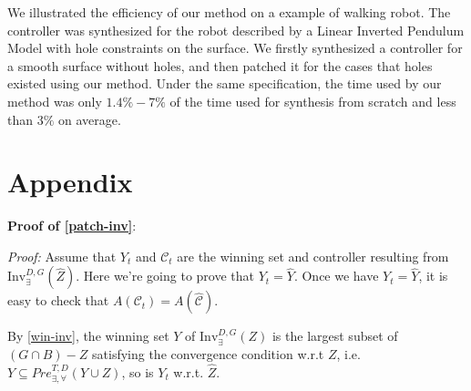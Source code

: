 We illustrated the efficiency of our method on a example of walking robot. The controller was synthesized for the robot described by a Linear Inverted Pendulum Model with hole constraints on the surface. We firstly synthesized a controller for a smooth surface without holes, and then patched it for the cases that holes existed using our method. Under the same specification, the time used by our method was only $ 1.4\%-7\% $ of the time used for synthesis from scratch and less than $ 3\% $ on average. 




\iffalse
\section{Appendix}
\textbf{Proof of \eqref{patch-inv}}:

\emph{Proof:}
	Assume that $ Y_t $ and $ \mathcal{C}_t $ are the winning set and controller resulting from $ \text{Inv}_{\exists}^{D,G} (\widehat{Z}) $. Here we're going to prove that $ Y_t=\widehat{Y}$. Once we have $ Y_t=\widehat{Y}$, it is easy to check that $ A(\mathcal{C}_t) = A(\widehat{\mathcal{C}}) $.
	
	By \eqref{win-inv}, the winning set $ Y $ of $ \text{Inv}_{\exists}^{D,G} (Z) $ is the largest subset of $ (G\cap B) - Z  $ satisfying the convergence condition w.r.t $ Z $, i.e. $ Y \subseteq Pre^{T,D}_{\exists, \forall}(Y\cup Z) $, so is $ Y_t $ w.r.t. $ \widehat{Z} $.
	
